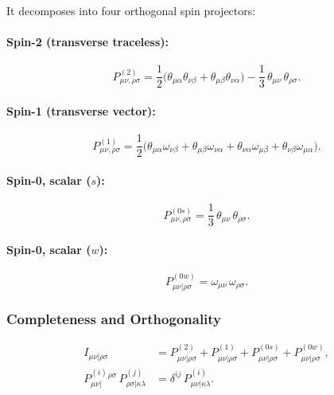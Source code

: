 \documentclass[aps,preprintnumbers,superscriptaddress,longbibliography]{revtex4-1}
\begin{document}
  It decomposes into four orthogonal spin projectors:
  \paragraph{Spin-2 (transverse traceless):}
  \begin{equation}
  \label{eq:Spin-2}
      P^{(2)}_{\mu\nu,\rho\sigma} = \frac{1}{2}
      \bigl(\theta_{\mu\alpha}\theta_{\nu\beta}
          + \theta_{\mu\beta}\theta_{\nu\alpha}\bigr)
      - \frac{1}{3}\,\theta_{\mu\nu}\,\theta_{\rho\sigma}.
  \end{equation}

  \paragraph{Spin-1 (transverse vector):}
  \begin{equation}
      P^{(1)}_{\mu\nu,\rho\sigma} = \frac{1}{2}
      \bigl(\theta_{\mu\alpha}\omega_{\nu\beta}
          + \theta_{\mu\beta}\omega_{\nu\alpha}
          + \theta_{\nu\alpha}\omega_{\mu\beta}
          + \theta_{\nu\beta}\omega_{\mu\alpha}\bigr).
  \end{equation}

  \paragraph{Spin-0, scalar ($s$):}
  \begin{equation}
  \label{eq:spin-0}
      P^{(0s)}_{\mu\nu,\rho\sigma} = \frac{1}{3}\,\theta_{\mu\nu}\,\theta_{\rho\sigma}.
  \end{equation}

  \paragraph{Spin-0, scalar ($w$):}
  \begin{equation}
      \label{eq:spin0}P^{(0w)}_{\mu\nu|\rho\sigma} = \omega_{\mu\nu}\,\omega_{\rho\sigma}.
  \end{equation}

  \subsubsection{Completeness and Orthogonality}

  \begin{align}
      I_{\mu\nu|\rho\sigma}
      &= P^{(2)}_{\mu\nu|\rho\sigma}
       + P^{(1)}_{\mu\nu|\rho\sigma}
       + P^{(0s)}_{\mu\nu|\rho\sigma}
       + P^{(0w)}_{\mu\nu|\rho\sigma}, \\[4pt]
      P^{(i)}_{\mu\nu|}{}^{\rho\sigma}\,P^{(j)}_{\rho\sigma|\kappa\lambda}
      &= \delta^{ij}\,P^{(i)}_{\mu\nu|\kappa\lambda}.
  \end{align}
\end{document}
